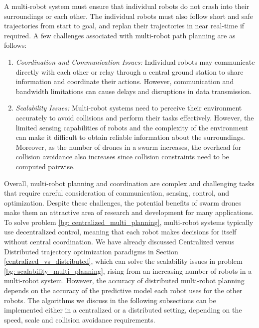 A multi-robot system must ensure that individual robots do not crash into their surroundings or each other. The individual robots must also follow short and safe trajectories from start to goal, and replan their trajectories in near real-time if required. A few challenges associated with multi-robot path planning are as follows:

\begin{enumerate}
    \item \label{bg: centralized_multi_planning}\textit{Coordination and Communication Issues:} Individual robots may communicate directly with each other or relay through a central ground station to share information and coordinate their actions. However, communication and bandwidth limitations can cause delays and disruptions in data transmission. 

    \item \label{bg: scalability_multi_planning}\textit{Scalability Issues:} Multi-robot systems need to perceive their environment accurately to avoid collisions and perform their tasks effectively. However, the limited sensing capabilities of robots and the complexity of the environment can make it difficult to obtain reliable information about the surroundings. Moreover, as the number of drones in a swarm increases, the overhead for collision avoidance also increases since collision constraints need to be computed pairwise.
    
\end{enumerate}

Overall, multi-robot planning and coordination are complex and challenging tasks that require careful consideration of communication, sensing, control, and optimization. Despite these challenges, the potential benefits of swarm drones make them an attractive area of research and development for many applications. To solve problem \ref{bg: centralized_multi_planning}, multi-robot systems typically use decentralized control, meaning that each robot makes decisions for itself without central coordination. We have already discussed Centralized versus Distributed trajectory optimization paradigms in Section \ref{centralized_vs_distributed}, which can solve the scalability issues in problem \ref{bg: scalability_multi_planning}, rising from an increasing number of robots in a multi-robot system. However, the accuracy of distributed multi-robot planning depends on the accuracy of the predictive model each robot uses for the other robots. The algorithms we discuss in the following subsections can be implemented either in a centralized or a distributed setting, depending on the speed, scale and collision avoidance requirements. 

